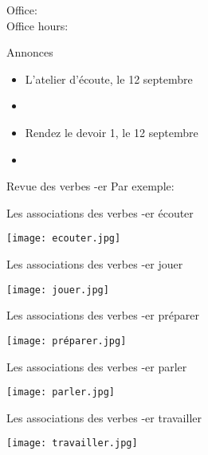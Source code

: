 \documentclass{beamer}
\subtitle[Activités]{Nos activités}
\begin{document}
  \begin{frame}
    \titlepage
    \tiny{Office: \\
          Office hours: }
  \end{frame}

  \begin{frame}{Annonces}
    \begin{itemize}
      \item L'atelier d'écoute, le 12 septembre
      \item[] 
      \item Rendez le devoir 1, le 12 septembre
      \item[] 
    \end{itemize}
  \end{frame}

  \begin{frame}{Revue des verbes -er}
    Par exemple:
    
  \end{frame}

  \begin{frame}{Les associations des verbes -er}
    \centering
    écouter

    \texttt{[image: ecouter.jpg]}
  \end{frame}

  \begin{frame}{Les associations des verbes -er}
    \centering
    jouer

    \texttt{[image: jouer.jpg]}
  \end{frame}

  \begin{frame}{Les associations des verbes -er}
    \centering
    préparer

    \texttt{[image: préparer.jpg]}
  \end{frame}

  \begin{frame}{Les associations des verbes -er}
    \centering
    parler

    \texttt{[image: parler.jpg]}
  \end{frame}

  \begin{frame}{Les associations des verbes -er}
    \centering
    travailler

    \texttt{[image: travailler.jpg]}
  \end{frame}
\end{document}
